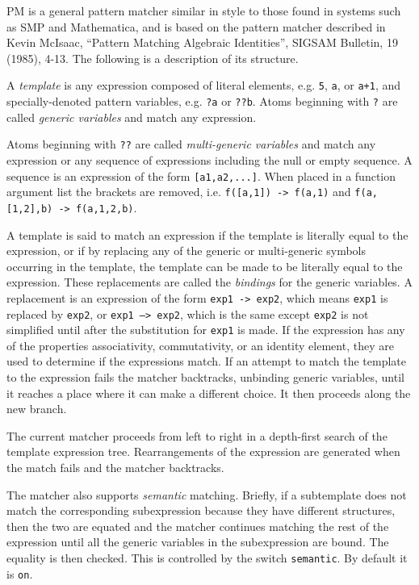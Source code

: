 PM is a general pattern matcher similar in style to those found in systems such
as SMP and Mathematica, and is based on the pattern matcher described in Kevin
McIsaac, ``Pattern Matching Algebraic Identities'', SIGSAM Bulletin, 19 (1985),
4-13.  The following is a description of its structure.

A \emph{template} is any expression composed of literal elements,
e.g. \texttt{5}, \texttt{a}, or \texttt{a+1}, and specially-denoted pattern
variables, e.g. \texttt{?a} or \texttt{??b}.  Atoms beginning with \texttt{?}
are called \emph{generic variables} and match any expression.

Atoms beginning with \texttt{??} are called \emph{multi-generic variables} and
match any expression or any sequence of expressions including the null or empty
sequence.  A sequence is an expression of the form \texttt{[a1,a2,...]}.  When
placed in a function argument list the brackets are removed,
i.e. \texttt{f([a,1]) -> f(a,1)} and \texttt{f(a,[1,2],b) -> f(a,1,2,b)}.

A template is said to match an expression if the template is literally equal to
the expression, or if by replacing any of the generic or multi-generic symbols
occurring in the template, the template can be made to be literally equal to the
expression.  These replacements are called the \emph{bindings} for the generic
variables.  A replacement is an expression of the form \texttt{exp1 -> exp2},
which means \texttt{exp1} is replaced by \texttt{exp2}, or \texttt{exp1 -->
exp2}, which is the same except \texttt{exp2} is not simplified until after the
substitution for \texttt{exp1} is made.  If the expression has any of the
properties associativity, commutativity, or an identity element, they are used
to determine if the expressions match.  If an attempt to match the template to
the expression fails the matcher backtracks, unbinding generic variables, until
it reaches a place where it can make a different choice.  It then proceeds along
the new branch.

The current matcher proceeds from left to right in a depth-first search of the
template expression tree.  Rearrangements of the expression are generated when
the match fails and the matcher backtracks.

The matcher also supports \emph{semantic} matching.  Briefly, if a subtemplate
does not match the corresponding subexpression because they have different
structures, then the two are equated and the matcher continues matching the rest
of the expression until all the generic variables in the subexpression are
bound.  The equality is then checked.  This is controlled by the
switch \texttt{semantic}.  By default it is \texttt{on}.


